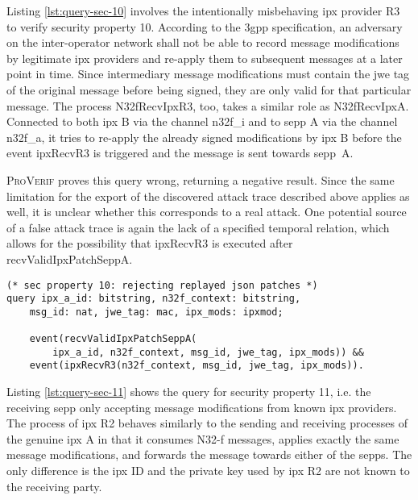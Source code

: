 Listing \ref{lst:query-sec-10} involves the intentionally misbehaving \gls{ipx} provider R3 to verify security property 10.
According to the \gls{3gpp} specification, an adversary on the inter-operator network shall not be able to record message modifications by legitimate \gls{ipx} providers and re-apply them to subsequent messages at a later point in time.
Since intermediary message modifications must contain the \gls{jwe} tag of the original message before being signed, they are only valid for that particular message.
The process {\sffamily N32fRecvIpxR3}, too, takes a similar role as {\sffamily N32fRecvIpxA}.
Connected to both \gls{ipx} B via the channel {\sffamily n32f\_i} and to \gls{sepp} A via the channel {\sffamily n32f\_a}, it tries to re-apply the already signed modifications by \gls{ipx} B before the event {\sffamily ipxRecvR3} is triggered and the message is sent towards \gls{sepp}~A.

\textsc{ProVerif} proves this query wrong, returning a negative result.
Since the same limitation for the export of the discovered attack trace described above applies as well, it is unclear whether this corresponds to a real attack.
One potential source of a false attack trace is again the lack of a specified temporal relation, which allows for the possibility that {\sffamily ipxRecvR3} is executed after {\sffamily recvValidIpxPatchSeppA}.

\begin{lstlisting}[caption={Query for security property 10},label={lst:query-sec-10},firstnumber=367]
(* sec property 10: rejecting replayed json patches *)
query ipx_a_id: bitstring, n32f_context: bitstring,
    msg_id: nat, jwe_tag: mac, ipx_mods: ipxmod;

    event(recvValidIpxPatchSeppA(
        ipx_a_id, n32f_context, msg_id, jwe_tag, ipx_mods)) &&
    event(ipxRecvR3(n32f_context, msg_id, jwe_tag, ipx_mods)).
\end{lstlisting}

Listing \ref{lst:query-sec-11} shows the query for security property 11, i.e. the receiving \gls{sepp} only accepting message modifications from known \gls{ipx} providers.
The process of \gls{ipx} R2 behaves similarly to the sending and receiving processes of the genuine \gls{ipx} A in that it consumes N32-f messages, applies exactly the same message modifications, and forwards the message towards either of the \glspl{sepp}.
The only difference is the \gls{ipx} ID and the private key used by \gls{ipx} R2 are not known to the receiving party.

